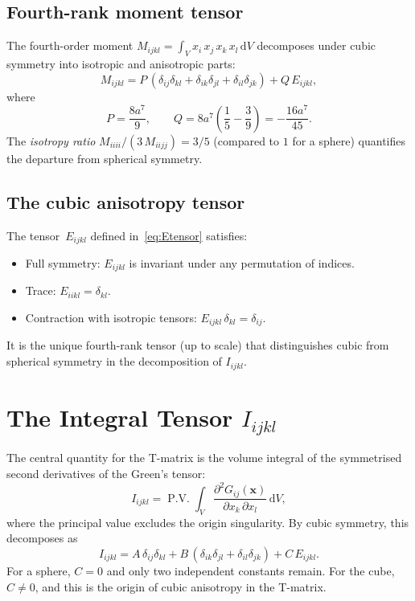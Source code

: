 \documentclass[11pt,a4paper]{article}
\newcommand{\bx}{\mathbf{x}}
\newcommand{\dd}{\mathrm{d}}
\newcommand{\PV}{\operatorname{P.V.}}
\begin{document}
\subsection{Fourth-rank moment tensor}

The fourth-order moment
$M_{ijkl} = \int_V x_i\,x_j\,x_k\,x_l\,\dd V$
decomposes under cubic symmetry into isotropic and anisotropic
parts:
\begin{equation}
  M_{ijkl} = P\,(\delta_{ij}\delta_{kl}
    + \delta_{ik}\delta_{jl} + \delta_{il}\delta_{jk})
  + Q\,E_{ijkl},
  \label{eq:moment4}
\end{equation}
where
\begin{equation}
  P = \frac{8a^7}{9},
  \qquad
  Q = 8a^7\!\left(\frac{1}{5} - \frac{3}{9}\right)
    = -\frac{16a^7}{45}.
  \label{eq:PQ}
\end{equation}
The \emph{isotropy ratio}
$M_{iiii}/(3\,M_{iijj}) = 3/5$ (compared to $1$ for a sphere)
quantifies the departure from spherical symmetry.

\subsection{The cubic anisotropy tensor}

The tensor~$E_{ijkl}$ defined in~\eqref{eq:Etensor} satisfies:
\begin{itemize}
  \item Full symmetry: $E_{ijkl}$ is invariant under any
    permutation of indices.
  \item Trace: $E_{iikl} = \delta_{kl}$.
  \item Contraction with isotropic tensors:
    $E_{ijkl}\,\delta_{kl} = \delta_{ij}$.
\end{itemize}
It is the unique fourth-rank tensor (up to scale) that distinguishes
cubic from spherical symmetry in the decomposition of
$I_{ijkl}$.

\section{The Integral Tensor \texorpdfstring{$I_{ijkl}$}{I\_ijkl}}
\label{sec:integral}

The central quantity for the T-matrix is the volume integral of the
symmetrised second derivatives of the Green's tensor:
\begin{equation}
  I_{ijkl} = \PV \int_V
    \frac{\partial^2 G_{ij}(\bx)}{\partial x_k \,\partial x_l}
    \,\dd V,
  \label{eq:Idef}
\end{equation}
where the principal value excludes the origin singularity. By
cubic symmetry, this decomposes as
\begin{equation}
  \boxed{
  I_{ijkl} = A\,\delta_{ij}\delta_{kl}
    + B\,(\delta_{ik}\delta_{jl} + \delta_{il}\delta_{jk})
    + C\,E_{ijkl}.
  }
  \label{eq:Idecomp}
\end{equation}
For a sphere, $C = 0$ and only two independent constants remain.
For the cube, $C \neq 0$, and this is the origin of cubic anisotropy
in the T-matrix.
\end{document}
